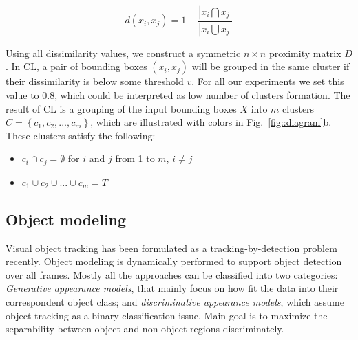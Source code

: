\begin{equation}
d(x_i,x_j) = 1 - \frac{|x_i \bigcap x_j|}{|x_i \bigcup  x_j|}
\label{eq::diff}
\end{equation}

Using all dissimilarity values, we construct a symmetric $n \times n$ proximity
matrix $D$. In CL, a pair of bounding boxes $(x_i, x_j)$ will be grouped in
the same cluster if their dissimilarity is below some threshold $v$.
For all our experiments we set this value to $0.8$, which could be interpreted as
low number of clusters formation.
The result of CL is a grouping of the input bounding boxes $X$ into 
$m$ clusters $C = \left \{ c_1, c_2, ..., c_m \right \}$,
which are illustrated with colors in Fig.~\ref{fig::diagram}b. These clusters
satisfy the following:
\begin{itemize}
\item $c_i \cap c_j = \emptyset$ for $i$ and $j$ from 1 to $m$, $i \neq j$
\item $c_1 \cup c_2 \cup ... \cup c_m = T$
\end{itemize}

\subsection{Object modeling}
Visual object tracking has been formulated as a tracking-by-detection problem
recently. Object modeling is dynamically performed to support object detection
over all frames. Mostly all the approaches can be classified into two categories:
\textit{Generative appearance models}, that mainly focus on how fit the data into
their correspondent object class; and \textit{discriminative appearance models},
which assume object tracking as a binary classification issue. Main goal is to
maximize the separability between object and non-object regions discriminately.

